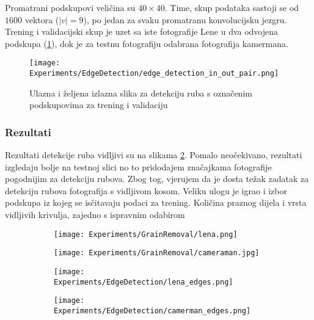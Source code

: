 Promatrani podskupovi veličina su $40 \times 40$.
Time, skup podataka sastoji se od $1600$ vektora ($|v| = 9$), po jedan za svaku promatranu konvolucijsku jezgru.
Trening i validacijski skup je uzet sa iste fotografije Lene u dva odvojena podskupa (\ref{fig:edge_detection_in_out_pair_example}), dok je za testnu fotografiju odabrana fotografija kamermana.

\begin{figure}
	\centering
	\texttt{[image: Experiments/EdgeDetection/edge\_detection\_in\_out\_pair.png]}
	\caption{Ulazna i željena izlazna slika za detekciju ruba s označenim podskupovima za trening i validaciju}
	\label{fig:edge_detection_in_out_pair_example}
\end{figure}

\subsubsection{Rezultati}

Rezultati detekcije ruba vidljivi su na slikama \ref{fig:edge_detection_results}. %
Pomalo neočekivano, rezultati izgledaju bolje na testnoj slici no to pridodajem značajkama fotografije pogodnijim za detekciju rubova.
Zbog tog, vjerujem da je dosta težak zadatak za detekciju rubova fotografija s vidljivom kosom.
Veliku ulogu je igrao i izbor podskupa iz kojeg se isčitavaju podaci za trening.
Količina praznog dijela i vrsta vidljivih krivulja, zajedno s ispravnim odabirom

\begin{figure}
	\centering
	\caption{Fotografije Lene i Kamermana prije i poslije detekcije rubova}
	\begin{subfigure}[t]{0.48\textwidth}
		\texttt{[image: Experiments/GrainRemoval/lena.png]}
	\end{subfigure}
	\begin{subfigure}[t]{0.48\textwidth}
		\texttt{[image: Experiments/GrainRemoval/cameraman.jpg]}
	\end{subfigure}
	\begin{subfigure}[t]{0.48\textwidth}
		\texttt{[image: Experiments/EdgeDetection/lena\_edges.png]}
	\end{subfigure}
	\begin{subfigure}[t]{0.48\textwidth}
		\texttt{[image: Experiments/EdgeDetection/camerman\_edges.png]}
	\end{subfigure}
	\label{fig:edge_detection_results}
\end{figure}

